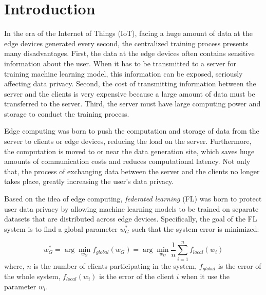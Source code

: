 \documentclass[runningheads]{llncs}
\begin{document}
\section{Introduction}

In the era of the Internet of Things (IoT), facing a huge amount of data at the edge devices generated every second, the centralized training process presents many disadvantages. First, the data at the edge devices often contains sensitive information about the user. When it has to be transmitted to a server for training machine learning model, this information can be exposed, seriously affecting data privacy. Second, the cost of transmitting information between the server and the clients is very expensive because a large amount of data must be transferred to the server. Third, the server must have large computing power and storage to conduct the training process.

Edge computing \cite{khan2019edge} was born to push the computation and storage of data from the server to clients or edge devices, reducing the load on the server. Furthermore, the computation is moved to or near the data generation site, which saves huge amounts of communication costs and reduces computational latency. Not only that, the process of exchanging data between the server and the clients no longer takes place, greatly increasing the user's data privacy.

Based on the idea of edge computing, \textit{federated learning} (FL) \cite{mcmahan2017communication} was born to protect user data privacy by allowing machine learning models to be trained on separate datasets that are distributed across edge devices. Specifically, the goal of the FL system is to find a global parameter $w_G^*$ such that the system error is minimized:

\begin{dmath}
    w_G^* = \arg\min_{w_G}{f_{global}(w_G)}
        = \arg\min_{w_G}{\frac{1}{n} \sum_{i=1}^n{f_{local}(w_i)}}
\end{dmath} where, $n$ is the number of clients participating in the system, $f_{global}$ is the error of the whole system, $f_{local}(w_i)$ is the error of the client $i$ when it use the parameter $w_i$.
\end{document}
